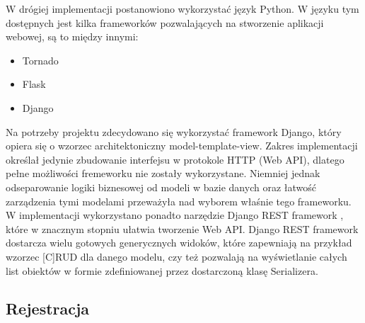 \documentclass[12pt, notitlepage]{article}
\begin{document}
W drógiej implementacji postanowiono wykorzystać język Python. W języku tym dostępnych jest kilka frameworków pozwalających na stworzenie aplikacji webowej, są to między innymi:
\begin{itemize}
    \item Tornado
    \item Flask
    \item Django
\end{itemize}

Na potrzeby projektu zdecydowano się wykorzystać framework Django, który opiera się o wzorzec architektoniczny model-template-view. Zakres implementacji określał jedynie zbudowanie interfejsu w protokole HTTP (Web API), dlatego pełne możliwości fremeworku nie zostały wykorzystane. Niemniej jednak odseparowanie logiki biznesowej od modeli w bazie danych oraz łatwość zarządzenia tymi modelami przeważyła nad wyborem właśnie tego frameworku. W implementacji wykorzystano ponadto narzędzie Django REST framework \cite{django_rest_framework}, które w znacznym stopniu ułatwia tworzenie Web API. Django REST framework dostarcza wielu gotowych generycznych widoków, które zapewniają na przykład wzorzec [C]RUD dla danego modelu, czy też pozwalają na wyświetlanie całych list obiektów w formie zdefiniowanej przez dostarczoną klasę Serializera.

\subsection{Rejestracja} \label{sec:rejestracja}
\end{document}
